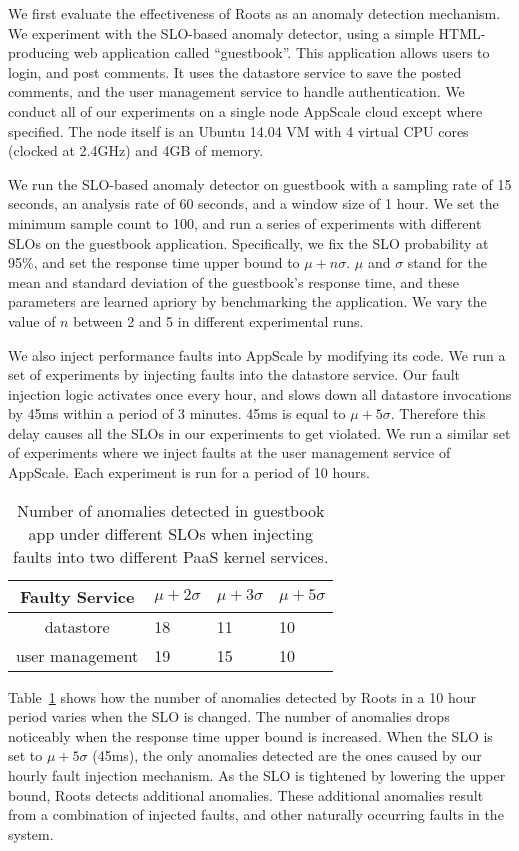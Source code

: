 We first evaluate the effectiveness of Roots as an anomaly detection mechanism. We experiment with
the SLO-based anomaly detector, using a simple HTML-producing web application called ``guestbook''.
This application allows users to login, and post comments. It uses the datastore service to save
the posted comments, and the user management service to handle authentication. We conduct all
of our experiments on a single node AppScale cloud except where specified. The node itself is an Ubuntu
14.04 VM with 4 virtual CPU cores (clocked at 2.4GHz) and 4GB of memory.

We run the SLO-based anomaly detector on guestbook with a sampling rate of 15 seconds, an analysis
rate of 60 seconds, and a window size of 1 hour. We set the minimum sample count to 100, and
run a series of experiments with different SLOs on the guestbook application. Specifically, we fix
the SLO probability at 95\%, and set the response time upper bound to $\mu + n\sigma$. 
$\mu$ and $\sigma$ stand for the mean and standard deviation of the
guestbook's response time, and these parameters are learned apriory by benchmarking
the application. We vary the value of $n$ between 2 and 5 in different experimental runs.

We also inject performance faults into AppScale by modifying its code. We run a set of experiments
by injecting faults into the datastore service. Our fault injection logic activates once every hour, and
slows down all datastore invocations by 45ms within a period of 3 minutes. 45ms is equal 
to $\mu + 5\sigma$. Therefore this delay causes all the SLOs in our experiments to get violated. 
We run a similar set of experiments where
we inject faults at the user management service of AppScale. Each experiment is run for a 
period of 10 hours.

\begin{table}
\begin{center}
\begin{tabular}{|c|p{1cm}|p{1cm}|p{1cm}|}
\hline
Faulty Service & $\mu + 2\sigma$ & $\mu + 3\sigma$ & $\mu + 5\sigma$ \\ \hline
datastore & 18 & 11 & 10 \\ \hline
user management & 19 & 15 & 10 \\ \hline
\end{tabular}
\end{center}
\caption{Number of anomalies detected in guestbook app under different SLOs when
injecting faults into two different PaaS kernel services.
\label{tab:anomaly_counts}
}
\end{table}

Table~\ref{tab:anomaly_counts} shows how the number of anomalies detected by 
Roots in a 10 hour period varies when the SLO is changed. The number of anomalies
drops noticeably when the response time upper bound is increased. When the
SLO is set to $\mu + 5\sigma$ (45ms), the only anomalies detected are the ones
caused by our hourly fault injection mechanism. As the SLO is tightened by lowering the upper bound,
Roots detects additional anomalies. These additional anomalies
result from a combination of injected faults, and other naturally occurring faults
in the system.